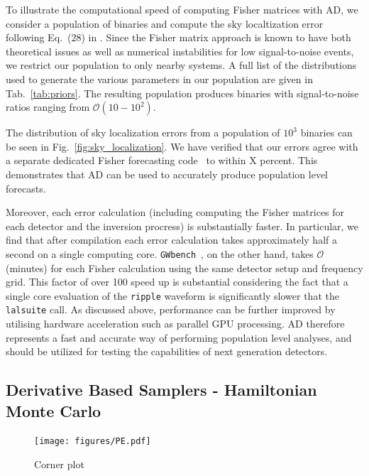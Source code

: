 \documentclass[twocolumn]{aastex631}
\newcommand{\ripple}{\texttt{ripple}\xspace}
\newcommand{\lalsuite}{\texttt{lalsuite}\xspace}
\begin{document}
To illustrate the computational speed of computing Fisher matrices with AD, we consider a population of binaries and compute the sky localtization error following Eq.~(28) in \citep{Iacovelli:2022bbs, Iacovelli:2022mbg}.
Since the Fisher matrix approach is known to have both theoretical issues as well as numerical instabilities for low signal-to-noise events, we restrict our population to only nearby systems.
A full list of the distributions used to generate the various parameters in our population are given in Tab.~\ref{tab:priors}.
The resulting population produces binaries with signal-to-noise ratios ranging from $\mathcal{O}(10-10^2)$.

The distribution of sky localization errors from a population of $10^3$ binaries can be seen in Fig.~\ref{fig:sky_localization}.
We have verified that our errors agree with a separate dedicated Fisher forecasting code~\citep{Borhanian:2020ypi} to within X percent.
This demonstrates that AD can be used to accurately produce population level forecasts.

Moreover, each error calculation (including computing the Fisher matrices for each detector and the inversion procress) is substantially faster.
In particular, we find that after compilation each error calculation takes approximately half a second on a single computing core.
\texttt{GWbench}~\citep{Borhanian:2020ypi}, on the other hand, takes $\mathcal{O}$(minutes) for each Fisher calculation using the same detector setup and frequency grid.
This factor of over 100 speed up is substantial considering the fact that a single core evaluation of the \ripple waveform is significantly slower that the \lalsuite call.
As discussed above, performance can be further improved by utilising hardware acceleration such as parallel GPU processing.
AD therefore represents a fast and accurate way of performing population level analyses, and should be utilized for testing the capabilities of next generation detectors.

\subsection{Derivative Based Samplers - Hamiltonian Monte Carlo}
\label{subsec:hmc}

\begin{figure}[t]
    \centering
    \texttt{[image: figures/PE.pdf]}
    \caption{
        Corner plot
    }
    \label{fig:corner}
\end{figure}
\end{document}
